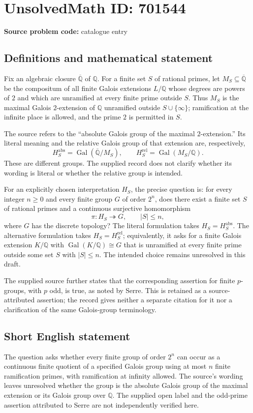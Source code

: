 \documentclass[11pt]{article}
\newcommand{\Q}{\mathbb{Q}}
\begin{document}
\section*{UnsolvedMath ID: 701544}
\textbf{Source problem code:} catalogue entry
\subsection{Definitions and mathematical statement}
Fix an algebraic closure $\overline{\Q}$ of $\Q$. For a finite set $S$ of rational primes, let $M_S\subseteq\overline{\Q}$ be the compositum of all finite Galois extensions $L/\Q$ whose degrees are powers of $2$ and which are unramified at every finite prime outside $S$. Thus $M_S$ is the maximal Galois $2$-extension of $\Q$ unramified outside $S\cup\{\infty\}$; ramification at the infinite place is allowed, and the prime $2$ is permitted in $S$.

The source refers to the ``absolute Galois group of the maximal $2$-extension.'' Its literal meaning and the relative Galois group of that extension are, respectively,
\[
 H_S^{\mathrm{abs}}=\operatorname{Gal}(\overline{\Q}/M_S),
 \qquad
 H_S^{\mathrm{rel}}=\operatorname{Gal}(M_S/\Q).
\]
These are different groups. The supplied record does not clarify whether its wording is literal or whether the relative group is intended.

For an explicitly chosen interpretation $H_S$, the precise question is: for every integer $n\geq 0$ and every finite group $G$ of order $2^n$, does there exist a finite set $S$ of rational primes and a continuous surjective homomorphism
\[
 \pi:H_S\twoheadrightarrow G,
 \qquad |S|\leq n,
\]
where $G$ has the discrete topology? The literal formulation takes $H_S=H_S^{\mathrm{abs}}$. The alternative formulation takes $H_S=H_S^{\mathrm{rel}}$; equivalently, it asks for a finite Galois extension $K/\Q$ with $\operatorname{Gal}(K/\Q)\cong G$ that is unramified at every finite prime outside some set $S$ with $|S|\leq n$. The intended choice remains unresolved in this draft.

The supplied source further states that the corresponding assertion for finite $p$-groups, with $p$ odd, is true, as noted by Serre. This is retained as a source-attributed assertion; the record gives neither a separate citation for it nor a clarification of the same Galois-group terminology.
\subsection{Short English statement}
The question asks whether every finite group of order $2^n$ can occur as a continuous finite quotient of a specified Galois group using at most $n$ finite ramification primes, with ramification at infinity allowed. The source's wording leaves unresolved whether the group is the absolute Galois group of the maximal extension or its Galois group over $\Q$. The supplied open label and the odd-prime assertion attributed to Serre are not independently verified here.
\end{document}
